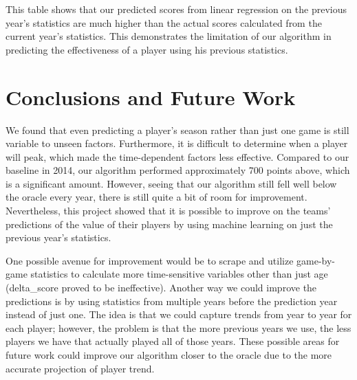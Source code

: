 \documentclass[12pt]{amsart}
\begin{document}
This table shows that our predicted scores from linear regression on the previous year's statistics are much higher than the actual scores calculated from the current year's statistics. This demonstrates the limitation of our algorithm in predicting the effectiveness of a player using his previous statistics.

\section{\large Conclusions and Future Work}
We found that even predicting a player's season rather than just one game is still variable to unseen factors. Furthermore, it is difficult to determine when a player will peak, which made the time-dependent factors less effective. Compared to our baseline in 2014, our algorithm performed approximately 700 points above, which is a significant amount. However, seeing that our algorithm still fell well below the oracle every year, there is still quite a bit of room for improvement. Nevertheless, this project showed that it is possible to improve on the teams' predictions of the value of their players by using machine learning on just the previous year's statistics.
\vspace{.4cm}

One possible avenue for improvement would be to scrape and utilize game-by-game statistics to calculate more time-sensitive variables other than just age (delta\_score proved to be ineffective). Another way we could improve the predictions is by using statistics from multiple years before the prediction year instead of just one. The idea is that we could capture trends from year to year for each player; however, the problem is that the more previous years we use, the less players we have that actually played all of those years. These possible areas for future work could improve our algorithm closer to the oracle due to the more accurate projection of player trend.
\end{document}

